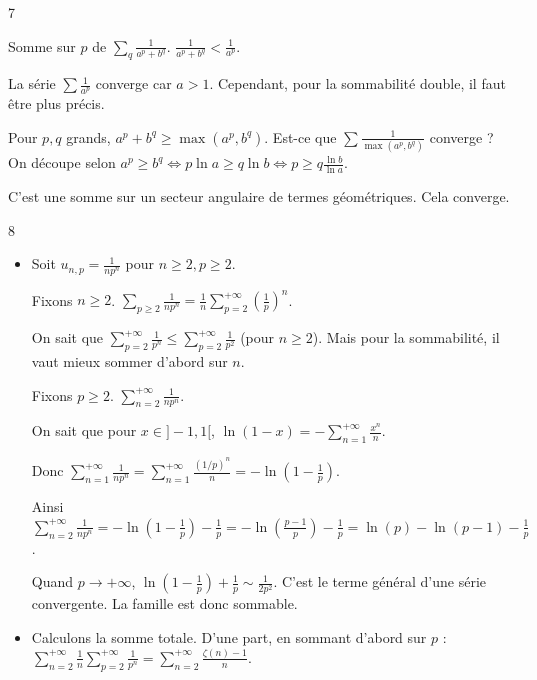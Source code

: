 \begin{correction}{7}
\begin{enumerate}
        Somme sur $p$ de $\sum_q \frac{1}{a^p+b^q}$.
        $\frac{1}{a^p+b^q} < \frac{1}{a^p}$.

        La série $\sum \frac{1}{a^p}$ converge car $a>1$.
        Cependant, pour la sommabilité double, il faut être plus précis.

        Pour $p,q$ grands, $a^p+b^q \ge \max(a^p, b^q)$.
        Est-ce que $\sum \frac{1}{\max(a^p, b^q)}$ converge ?
        On découpe selon $a^p \ge b^q \iff p \ln a \ge q \ln b \iff p \ge q \frac{\ln b}{\ln a}$.

        C'est une somme sur un secteur angulaire de termes géométriques. Cela converge.
\end{enumerate}
\end{correction}

\begin{correction}{8}
\begin{itemize}
    \item 
        Soit $u_{n,p} = \frac{1}{n p^n}$ pour $n \ge 2, p \ge 2$.

        Fixons $n \geqslant 2$. $\displaystyle \sum_{p \ge 2} \frac{1}{n p^n} = \frac{1}{n} \sum_{p=2}^{+\infty} \left(\frac{1}{p}\right)^n$.
        
        On sait que $\displaystyle \sum_{p=2}^{+\infty} \frac{1}{p^n} \le \sum_{p=2}^{+\infty} \frac{1}{p^2}$ (pour $n \ge 2$).
        Mais pour la sommabilité, il vaut mieux sommer d'abord sur $n$.
        
        Fixons $p \ge 2$. $\displaystyle\sum_{n=2}^{+\infty} \frac{1}{n p^n}$.
        
        On sait que pour $x \in ]-1,1[$, $\displaystyle\ln(1-x) = -\sum_{n=1}^{+\infty} \frac{x^n}{n}$.

        Donc $\displaystyle \sum_{n=1}^{+\infty} \frac{1}{n p^n} = \sum_{n=1}^{+\infty} \frac{(1/p)^n}{n} = -\ln\left(1-\frac{1}{p}\right)$.

        Ainsi $\displaystyle \sum_{n=2}^{+\infty} \frac{1}{n p^n} = -\ln\left(1-\frac{1}{p}\right) - \frac{1}{p} = -\ln\left(\frac{p-1}{p}\right) - \frac{1}{p} = \ln(p) - \ln(p-1) - \frac{1}{p}$.

        Quand $p \to +\infty$, $\ln\left(1-\frac{1}{p}\right) + \frac{1}{p} \sim \frac{1}{2p^2}$.
        C'est le terme général d'une série convergente.
        La famille est donc sommable.
    \item 
        Calculons la somme totale.
        D'une part, en sommant d'abord sur $p$ :
        $\displaystyle \sum_{n=2}^{+\infty} \frac{1}{n} \sum_{p=2}^{+\infty} \frac{1}{p^n} = \sum_{n=2}^{+\infty} \frac{\zeta(n)-1}{n}$.


\end{itemize}
\end{correction}
